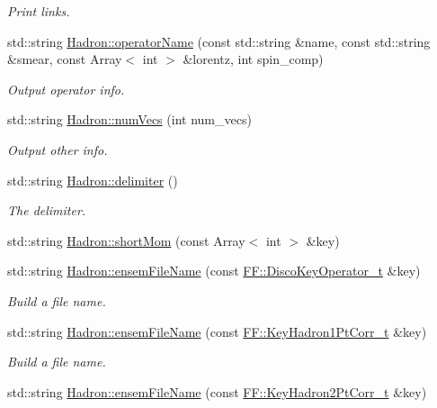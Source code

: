 \begin{DoxyCompactItemize}
\begin{DoxyCompactList}\small\item\em Print links. \end{DoxyCompactList}\item 
std\+::string \mbox{\hyperlink{namespaceHadron_a8f8a77c02a6415ffc31d2a300f59e6a6}{Hadron\+::operator\+Name}} (const std\+::string \&name, const std\+::string \&smear, const Array$<$ int $>$ \&lorentz, int spin\+\_\+comp)
\begin{DoxyCompactList}\small\item\em Output operator info. \end{DoxyCompactList}\item 
std\+::string \mbox{\hyperlink{namespaceHadron_afea9ddb2112da9cb61d87881799fff49}{Hadron\+::num\+Vecs}} (int num\+\_\+vecs)
\begin{DoxyCompactList}\small\item\em Output other info. \end{DoxyCompactList}\item 
std\+::string \mbox{\hyperlink{namespaceHadron_a2ea4a74b346adec57d30f2605fc00005}{Hadron\+::delimiter}} ()
\begin{DoxyCompactList}\small\item\em The delimiter. \end{DoxyCompactList}\item 
std\+::string \mbox{\hyperlink{namespaceHadron_aaaec62d26ea28ccc4d611b4797a1d667}{Hadron\+::short\+Mom}} (const Array$<$ int $>$ \&key)
\item 
std\+::string \mbox{\hyperlink{namespaceHadron_ae52edd7538c484e9f1c59f65a1d010ca}{Hadron\+::ensem\+File\+Name}} (const \mbox{\hyperlink{structFF_1_1DiscoKeyOperator__t}{F\+F\+::\+Disco\+Key\+Operator\+\_\+t}} \&key)
\begin{DoxyCompactList}\small\item\em Build a file name. \end{DoxyCompactList}\item 
std\+::string \mbox{\hyperlink{namespaceHadron_af97a705730e771598736c0ddcec48fea}{Hadron\+::ensem\+File\+Name}} (const \mbox{\hyperlink{structFF_1_1KeyHadron1PtCorr__t}{F\+F\+::\+Key\+Hadron1\+Pt\+Corr\+\_\+t}} \&key)
\begin{DoxyCompactList}\small\item\em Build a file name. \end{DoxyCompactList}\item 
std\+::string \mbox{\hyperlink{namespaceHadron_a031dddf6856dd71ac8114cf9c4106268}{Hadron\+::ensem\+File\+Name}} (const \mbox{\hyperlink{structFF_1_1KeyHadron2PtCorr__t}{F\+F\+::\+Key\+Hadron2\+Pt\+Corr\+\_\+t}} \&key)

\end{DoxyCompactItemize}
